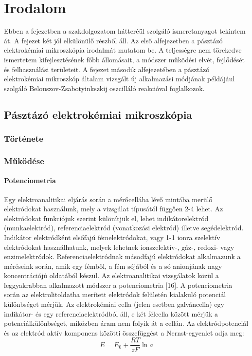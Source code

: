 \chapter{Irodalom}
\pagestyle{headings}

Ebben a fejezetben a szakdolgozatom hátteréül szolgáló ismeretanyagot tekintem át. A fejezet két jól elkülönülő részből áll. Az első alfejezetben a pásztázó elektrokémiai mikroszkópia irodalmát mutatom be. A teljességre nem törekedve ismertetem kifejlesztésének főbb állomásait, a módszer működési elvét, fejlődését és felhasználási területeit. A fejezet második alfejezetében a pásztázó elektrokémiai mikroszkóp általam vizsgált új alkalmazási módjának példájául szolgáló Belouszov-Zsabotyinkszkij oszcilláló reakcióval foglalkozok. 

\section{Pásztázó elektrokémiai mikroszkópia}
\subsection{Története}
\subsection{Működése}
\subsubsection{Potenciometria}
Egy elektroanalitikai eljárás során a mérőcellába lévő mintába merülő elektródokat használunk, mely a vizsgálat típusától függően 2-4 lehet. Az elektródokat funkciójuk szerint különítjük el, lehet indikátorelektród (munkaelektród), referenciaelektród (vonatkozási elektród) illetve segédelektród. Indikátor elektródként elsőfajú fémelektródokat, vagy 1-1 ionra szelektív elektródokat használhatunk, melyek lehetnek ionszelektív-, gáz-, redoxi- vagy enzimelektródok. Referenciaelektródnak másodfajú elektródokat alkalmazunk a méréseink során, amik egy fémből, a fém sójából és a só anionjának nagy koncentrációjú oldatából készül.
Az elektroanalitikai vizsgálatok közül a leggyakrabban alkalmazott módszer a potenciometria [16]. A potenciometria során az elektrolitoldatba merített elektródok felületén kialakuló potenciál különbséget mérjük. Az elektrokémiai cella (jelen esetben galváncella) egy indikátor- és egy referenciaelektródból áll, e két félcella között mérjük a potenciálkülönbséget, miközben áram nem folyik át a cellán. Az elektródpotenciál és az elektród aktív komponens közötti összefüggést a Nernst-egyenlet adja meg: 
\begin{equation}
E = E_\text{0} + \frac{RT}{zF} \ln a
\end{equation}

